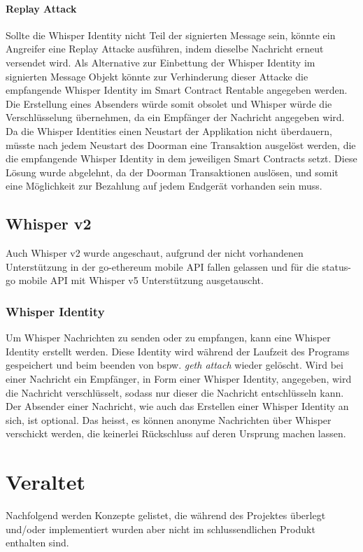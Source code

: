 \paragraph{Replay Attack}
Sollte die Whisper Identity nicht Teil der signierten Message sein, könnte ein Angreifer eine Replay Attacke ausführen, indem dieselbe Nachricht erneut versendet wird. Als Alternative zur Einbettung der Whisper Identity im signierten Message Objekt könnte zur Verhinderung dieser Attacke die empfangende Whisper Identity im Smart Contract Rentable angegeben werden. Die Erstellung eines Absenders würde somit obsolet und Whisper würde die Verschlüsselung übernehmen, da ein Empfänger der Nachricht angegeben wird. Da die Whisper Identities einen Neustart der Applikation nicht überdauern, müsste nach jedem Neustart des Doorman eine Transaktion ausgelöst werden, die die empfangende Whisper Identity in dem jeweiligen Smart Contracts setzt. Diese Lösung wurde abgelehnt, da der Doorman Transaktionen auslösen, und somit eine Möglichkeit zur Bezahlung auf jedem Endgerät vorhanden sein muss.

\subsection{Whisper v2}
Auch Whisper v2 wurde angeschaut, aufgrund der nicht vorhandenen Unterstützung in der go-ethereum mobile API fallen gelassen und für die status-go mobile API mit Whisper v5 Unterstützung ausgetauscht.

\subsubsection{Whisper Identity}
\label{old_subpara:Whisper_Identity}
Um Whisper Nachrichten zu senden oder zu empfangen, kann eine Whisper Identity erstellt werden. Diese Identity wird während der Laufzeit des Programs gespeichert und beim beenden von bspw. \emph{geth attach} wieder gelöscht. Wird bei einer Nachricht ein Empfänger, in Form einer Whisper Identity, angegeben, wird die Nachricht verschlüsselt, sodass nur dieser die Nachricht entschlüsseln kann. Der Absender einer Nachricht, wie auch das Erstellen einer Whisper Identity an sich, ist optional. Das heisst, es können anonyme Nachrichten über Whisper verschickt werden, die keinerlei Rückschluss auf deren Ursprung machen lassen. \cite[web3.shh/post]{web3js.readthedocs.io}

\section{Veraltet}
Nachfolgend werden Konzepte gelistet, die während des Projektes überlegt und/oder implementiert wurden aber nicht im schlussendlichen Produkt enthalten sind.

